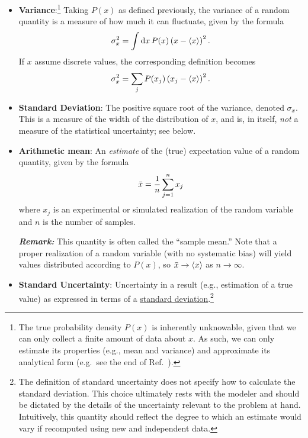 \begin{itemize}
\item {\bf Variance}:\footnote{The true probability density $P(x)$ is inherently unknowable, given that we can only collect a finite amount of data about $x$.  As such, we can only estimate its properties (e.g., mean and variance) and approximate its analytical form (e.g.\ see the end of Ref.\ \cite{SMC}).} Taking $P(x)$ as defined previously, the variance of a random quantity is a measure of how much it can fluctuate, given by the formula
\begin{align}
\sigma_x^2 = \int {\rm d}x\, P(x) \left( x  - \langle x \rangle \right)^2.
\end{align}
If $x$ assume discrete values, the corresponding definition becomes
\begin{align}
\sigma_x^2 = \sum_j P(x_j) \left( x_j  - \langle x \rangle \right)^2.
\end{align}

\item {\bf Standard Deviation}: The positive square root of the variance, denoted $\sigma_x$.\label{def:st_dev}  This is a measure of the width of the distribution of $x$, and is, in itself, \emph{not} a measure of the statistical uncertainty; see below.

\item {\bf Arithmetic mean}: An \emph{estimate} of the (true) expectation value of a random quantity, given by the formula
  \begin{equation}
    \bar{x} = \dfrac{1}{n} \sum_{j=1}^{n} x_j \label{def:arith_mean}
  \end{equation}
  where $x_j$ is an experimental or simulated realization of the random variable and $n$ is the number of samples.
\smallskip

\textbf{\textit{Remark:}} This quantity is often called the ``sample mean.''
Note that a proper realization of a random variable (with no systematic bias) will yield values distributed according to $P(x)$, so $\bar{x} \rightarrow \langle x \rangle$ as $n \rightarrow \infty$.


\item {\bf Standard Uncertainty}: Uncertainty in a result (e.g., estimation of a true value) as expressed in terms of a \hyperref[def:st_dev]{standard deviation}.\footnote{The definition of standard uncertainty does not specify how to calculate the standard deviation. This choice ultimately rests with the modeler and should be dictated by the details of the uncertainty relevant to the problem at hand.  Intuitively, this quantity should reflect the degree to which an estimate would vary if recomputed using new and independent data.}
  \label{def:std_unc}


\end{itemize}
